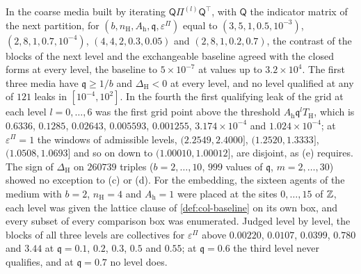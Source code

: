\begin{numcheck}\label{chk:ren-per-level}
In the coarse media built by iterating $\mathsf Q\Pi^{(l)}\mathsf Q^\top$, with $\mathsf Q$ the indicator matrix of the next partition, for $(b,n_{\mathrm H},A_{\mathrm h},\mathfrak q,\varepsilon^\Pi)$ equal to $(3,5,1,0.5,10^{-3})$, $(2,8,1,0.7,10^{-4})$, $(4,4,2,0.3,0.05)$ and $(2,8,1,0.2,0.7)$, the contrast of the blocks of the next level and the exchangeable baseline agreed with the closed forms at every level, the baseline to $5\times10^{-7}$ at values up to $3.2\times10^4$. The first three media have $\mathfrak q\ge1/b$ and $\Delta_{\mathrm H}<0$ at every level, and no level qualified at any of $121$ leaks in $[10^{-4},10^2]$. In the fourth the first qualifying leak of the grid at each level $l=0,\dots,6$ was the first grid point above the threshold $A_{\mathrm h}\mathfrak q^lT_{\mathrm H}$, which is $0.6336$, $0.1285$, $0.02643$, $0.005593$, $0.001255$, $3.174\times10^{-4}$ and $1.024\times10^{-4}$; at $\varepsilon^\Pi=1$ the windows of admissible levels, $(2.2549,2.4000]$, $(1.2520,1.3333]$, $(1.0508,1.0693]$ and so on down to $(1.00010,1.00012]$, are disjoint, as (e) requires. The sign of $\Delta_{\mathrm H}$ on $260739$ triples ($b=2,\dots,10$, $999$ values of $\mathfrak q$, $m=2,\dots,30$) showed no exception to (c) or (d). For the embedding, the sixteen agents of the medium with $b=2$, $n_{\mathrm H}=4$ and $A_{\mathrm h}=1$ were placed at the sites $0,\dots,15$ of $\mathbb{Z}$, each level was given the lattice clause of \cref{def:col-baseline} on its own box, and every subset of every comparison box was enumerated. Judged level by level, the blocks of all three levels are collectives for $\varepsilon^\Pi$ above $0.00220$, $0.0107$, $0.0399$, $0.780$ and $3.44$ at $\mathfrak q=0.1$, $0.2$, $0.3$, $0.5$ and $0.55$; at $\mathfrak q=0.6$ the third level never qualifies, and at $\mathfrak q=0.7$ no level does.


\end{numcheck}
